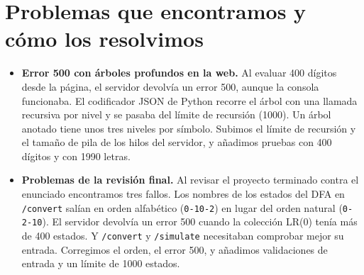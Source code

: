 \documentclass[11pt,a4paper]{article}
\begin{document}
\section{Problemas que encontramos y cómo los resolvimos}
\begin{itemize}
\item \textbf{Error 500 con árboles profundos en la web.} Al evaluar 400 dígitos desde la página, el servidor devolvía un error 500, aunque la consola funcionaba. El codificador JSON de Python recorre el árbol con una llamada recursiva por nivel y se pasaba del límite de recursión (1000). Un árbol anotado tiene unos tres niveles por símbolo. Subimos el límite de recursión y el tamaño de pila de los hilos del servidor, y añadimos pruebas con 400 dígitos y con 1990 letras.
\item \textbf{Problemas de la revisión final.} Al revisar el proyecto terminado contra el enunciado encontramos tres fallos. Los nombres de los estados del DFA en \texttt{/convert} salían en orden alfabético (\texttt{0-10-2}) en lugar del orden natural (\texttt{0-2-10}). El servidor devolvía un error 500 cuando la colección LR(0) tenía más de 400 estados. Y \texttt{/convert} y \texttt{/simulate} necesitaban comprobar mejor su entrada. Corregimos el orden, el error 500, y añadimos validaciones de entrada y un límite de 1000 estados.
\end{itemize}
\end{document}
